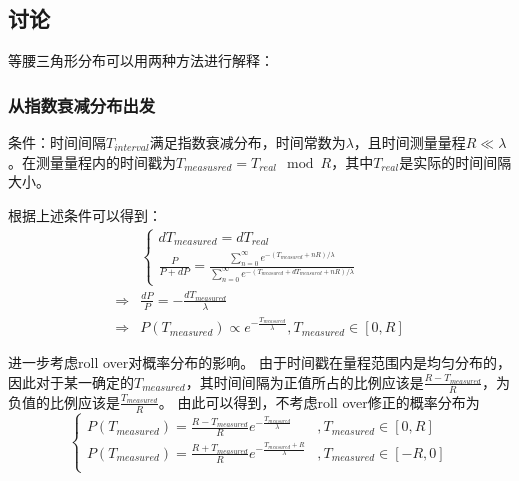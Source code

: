 \subsection{讨论}
等腰三角形分布可以用两种方法进行解释：
\subsubsection*{从指数衰减分布出发}
条件：时间间隔$T_{interval}$满足指数衰减分布，时间常数为$\lambda$，且时间测量量程$R\ll\lambda$。在测量量程内的时间戳为$T_{measusred}=T_{real}\mod R$，其中$T_{real}$是实际的时间间隔大小。

根据上述条件可以得到：
\begin{align}
&\begin{cases}
dT_{measured} =dT_{real}\\
\frac{P}{P+dP} = \frac{\sum\limits_{n=0}^{\infty}e^{-(T_{measured}+nR)/\lambda}}{\sum\limits_{n=0}^{\infty}e^{-(T_{measured}+dT_{measured}+nR)/\lambda}}
\end{cases}\\
\Rightarrow &\frac{dP}{P}=-\frac{dT_{measured}}{\lambda}\\
\Rightarrow &P(T_{measured})\propto e^{-\frac{T_{measured}}{\lambda}}, T_{measured}\in[0,R]
\end{align}

进一步考虑roll over对概率分布的影响。
由于时间戳在量程范围内是均匀分布的，因此对于某一确定的$T_{measured}$，其时间间隔为正值所占的比例应该是$\frac{R-T_{measured}}{R}$，为负值的比例应该是$\frac{T_{measured}}{R}$。
由此可以得到，不考虑roll over修正的概率分布为
\begin{equation}
	\begin{cases}
	P(T_{measured})=\frac{R-T_{measured}}{R}e^{-\frac{T_{measured}}{\lambda}} & ,T_{measured}\in[0,R]\\
	P(T_{measured})=\frac{R+T_{measured}}{R}e^{-\frac{T_{measured}+R}{\lambda}} &,T_{measured}\in[-R,0]\\
	\end{cases}
\end{equation}

